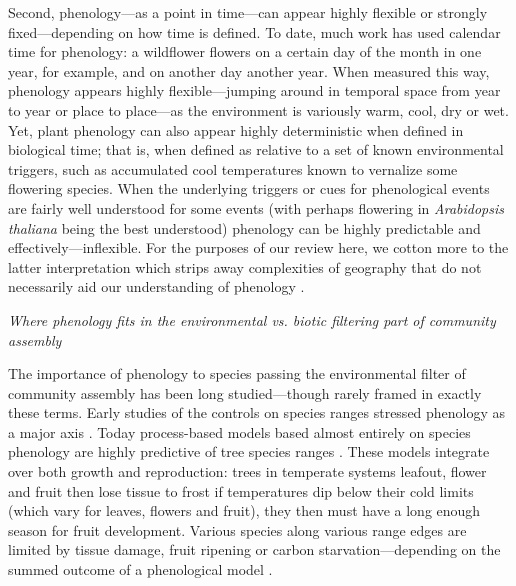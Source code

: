 \documentclass[11pt]{article}
\begin{document}
Second, phenology---as a point in time---can appear highly flexible or strongly fixed---depending on how time is defined. To date, much work has used calendar time for phenology: a wildflower flowers on a certain day of the month in one year, for example, and on another day another year. When measured this way, phenology appears highly flexible---jumping around in temporal space from year to year or place to place---as the environment is variously warm, cool, dry or wet. Yet, plant phenology can also appear highly deterministic when defined in biological time; that is, when defined as relative to a set of known environmental triggers, such as accumulated cool temperatures known to vernalize some flowering species. When the underlying triggers or cues for phenological events are fairly well understood for some events (with perhaps flowering in \emph{Arabidopsis thaliana} being the best understood) phenology can be highly predictable and effectively---inflexible. For the purposes of our review here, we cotton more to the latter interpretation which strips away complexities of geography that do not necessarily aid our understanding of phenology \citep{davies2013}. 

\emph{Where phenology fits in the environmental vs. biotic filtering part of community assembly}

The importance of phenology to species passing the environmental filter of community assembly has been long studied---though rarely framed in exactly these terms. Early studies of the controls on species ranges stressed phenology as a major axis \citep{salisbury1926geographical}. Today process-based models based almost entirely on species phenology are highly predictive of tree species ranges \citep[where they have been tested,][]{chuineJTB,Morin:2009gt,morin2007}. These models integrate over both growth and reproduction: trees in temperate systems leafout, flower and fruit then lose tissue to frost if temperatures dip below their cold limits (which vary for leaves, flowers and fruit), they then must have a long enough season for fruit development. Various species along various range edges are limited by tissue damage, fruit ripening or carbon starvation---depending on the summed outcome of a phenological model \citep{Chuine:2010gm}. 
\end{document}

